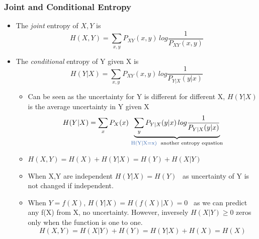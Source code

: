 \documentclass[12pt]{article}
\begin{document}
\subsubsection{Joint and Conditional Entropy}
\begin{itemize}
\item The \textit{joint} entropy of $X,Y$ is 
$$ H(X,Y) = \sum_{x,y}P_{XY}(x,y)\,log\frac{1}{P_{XY}(x,y)}$$

\item The \textit{conditional} entropy of Y given X is 
$$ H(Y|X) = \sum_{x,y}P_{XY}(x,y)\,log\frac{1}{P_{Y|X}(y|x)}$$
\begin{itemize}
\item Can be seen as the uncertainty for Y is different for different X, $H(Y|X)$ is the average uncertainty in Y given X
$$ H(Y|X) = \sum_{x}P_{X}(x)\,\underbrace{\sum_{y}P_{Y|X}(y|x)\,log\frac{1}{P_{Y|X}(y|x)}}_\text{\textcolor{blue1}{H(Y|X=x)}  \textrm{ another entropy equation}}$$
\item $H(X,Y) = H(X) + H(Y|X) = H(Y) + H(X|Y)$

\item When X,Y are independent $H(Y|X) = H(Y)$ \ as uncertainty of Y is not changed if  independent.

\item When $Y = f(X)$,  $H(Y|X) = H(f(X)|X) = 0$ \ as we can predict any f(X) from X, no uncertainty. However, inversely $H(X|Y) \ge 0$ zeros only when the function is one to one.
$$H(X,Y) = H(X|Y) + H(Y) = H(Y|X) + H(X) = H(X)$$
\end{itemize}
\end{itemize}
\end{document}
